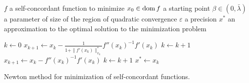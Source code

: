 \begin{algorithm}[ht]
  \begin{algorithmic}[1]
    \Require
      \Statex $f$ a self-concordant function to minimize
      \Statex $x_0 \in \operatorname{dom} f$ a starting point
      \Statex $\beta \in (0,\bar{\lambda})$ a parameter of size of the region of quadratic convergence
      \Statex $\varepsilon$ a precision
    \Ensure
      \Statex $x^*$ an approximation to the optimal solution to the minimization problem 
      \Statex

    \State $k \gets 0$
     
      \State $x_{k+1} \gets x_k - \frac{1}{1+\|f'(x_k)\|_{x_k}^*}f''(x_k)^{-1}f'(x_k)$
      \State $k \gets k + 1$
    \EndWhile {}
     
      \State $x_{k+1} \gets x_k - f''(x_k)^{-1}f'(x_k)$
      \State $k \gets k + 1$
    \EndWhile {}
    \State \Return $x^* \gets x_k$

  \end{algorithmic}
  \caption{Newton method for minimization of self-concordant functions.}
\end{algorithm}
